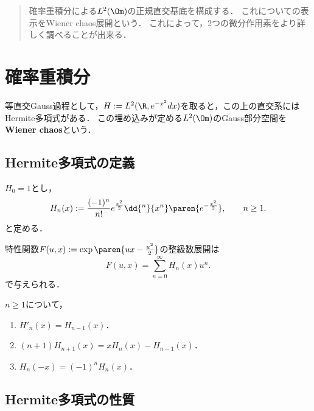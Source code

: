 \documentclass[uplatex,dvipdfmx]{jsreport}
\begin{document}
\begin{quotation}
    確率重積分による$L^2(\Om)$の正規直交基底を構成する．
    これについての表示をWiener chaos展開という．
    これによって，2つの微分作用素をより詳しく調べることが出来る．
\end{quotation}

\section{確率重積分}

\begin{tcolorbox}[colframe=ForestGreen, colback=ForestGreen!10!white,breakable,colbacktitle=ForestGreen!40!white,coltitle=black,fonttitle=\bfseries\sffamily,
title=]
    等直交Gauss過程として，$H:=L^2(\R,e^{-x^2}dx)$を取ると，この上の直交系にはHermite多項式がある．
    この埋め込みが定める$L^2(\Om)$のGauss部分空間を\textbf{Wiener chaos}という．
\end{tcolorbox}

\subsection{Hermite多項式の定義}

\begin{definition}
    $H_0=1$とし，
    \[H_n(x):=\frac{(-1)^n}{n!}e^{\frac{x^2}{2}}\dd{^n}{x^n}\paren{e^{-\frac{x^2}{2}}},\qquad n\ge1.\]
    と定める．
\end{definition}

\begin{lemma}
    特性関数$F(u,x):=\exp\paren{ux-\frac{u^2}{2}}$の整級数展開は
    \[F(u,x)=\sum_{n=0}^\infty H_n(x)u^n.\]
    で与えられる．
\end{lemma}

\begin{lemma}
    $n\ge1$について，
    \begin{enumerate}
        \item $H'_n(x)=H_{n-1}(x)$．
        \item $(n+1)H_{n+1}(x)=xH_n(x)-H_{n-1}(x)$．
        \item $H_n(-x)=(-1)^nH_n(x)$．
    \end{enumerate}
\end{lemma}

\subsection{Hermite多項式の性質}
\end{document}
